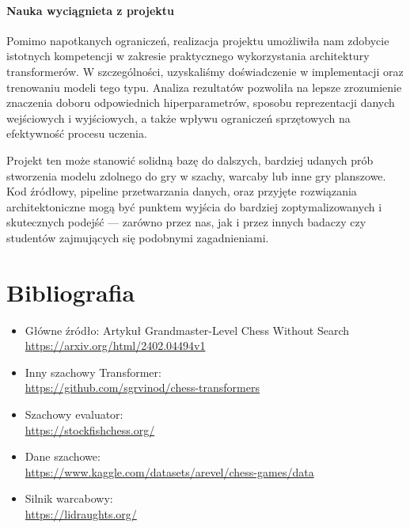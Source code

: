 \documentclass[12pt]{article}
\begin{document}
\paragraph{Nauka wyciągnieta z projektu} 
Pomimo napotkanych ograniczeń, realizacja projektu umożliwiła nam zdobycie istotnych kompetencji w zakresie praktycznego wykorzystania architektury transformerów. W szczególności, uzyskaliśmy doświadczenie w implementacji oraz trenowaniu modeli tego typu. Analiza rezultatów pozwoliła na lepsze zrozumienie znaczenia doboru odpowiednich hiperparametrów, sposobu reprezentacji danych wejściowych i wyjściowych, a także wpływu ograniczeń sprzętowych na efektywność procesu uczenia.

Projekt ten może stanowić solidną bazę do dalszych, bardziej udanych prób stworzenia modelu zdolnego do gry w szachy, warcaby lub inne gry planszowe. Kod źródłowy, pipeline przetwarzania danych, oraz przyjęte rozwiązania architektoniczne mogą być punktem wyjścia do bardziej zoptymalizowanych i skutecznych podejść — zarówno przez nas, jak i przez innych badaczy czy studentów zajmujących się podobnymi zagadnieniami.

\section{Bibliografia}
\begin{itemize}
    \item Główne źródło: Artykuł Grandmaster-Level Chess Without Search
       \\ \url{https://arxiv.org/html/2402.04494v1}
    \item Inny szachowy Transformer:
       \\ \url{https://github.com/sgrvinod/chess-transformers}
    \item Szachowy evaluator:
       \\ \url{https://stockfishchess.org/}
    \item Dane szachowe: 
       \\ \url{https://www.kaggle.com/datasets/arevel/chess-games/data}
    \item Silnik warcabowy: 
       \\ \url{https://lidraughts.org/}

\end{itemize}
\end{document}
